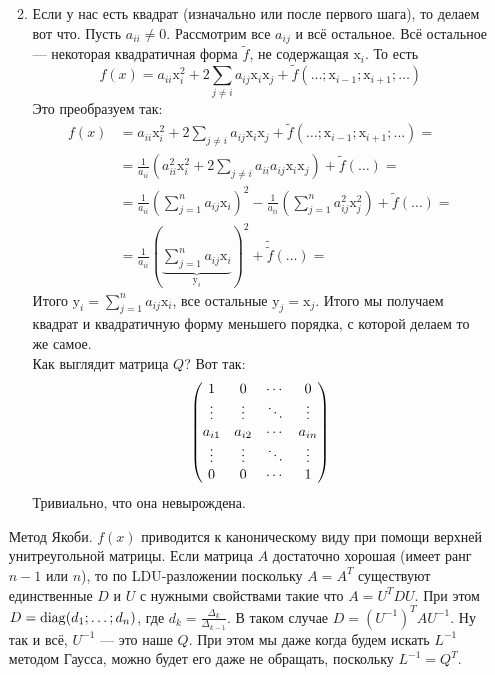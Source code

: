 \documentclass{article}
\begin{document}
\begin{itemize}
\begin{Comment}
\begin{enumerate}
$${                }
                $$
                \item Если у нас есть квадрат (изначально или после первого шага), то делаем вот что. Пусть $a_{ii}\neq0$. Рассмотрим все $a_{ij}$ и всё остальное. Всё остальное --- некоторая квадратичная форма $\widetilde f$, не содержащая $\mathrm x_i$. То есть
                $$
                f(x)=a_{ii}\mathrm x_i^2+2\sum\limits_{j\neq i}a_{ij}\mathrm x_i\mathrm x_j+\widetilde f(\ldots;\mathrm x_{i-1};\mathrm x_{i+1};\ldots)
                $$
                Это преобразуем так:
                \[\begin{split}
                    f(x)&=a_{ii}\mathrm x_i^2+2\sum\limits_{j\neq i}a_{ij}\mathrm x_i\mathrm x_j+\widetilde f(\ldots;\mathrm x_{i-1};\mathrm x_{i+1};\ldots)=\\
                    &=\frac1{a_{ii}}\left(a_{ii}^2\mathrm x_i^2+2\sum\limits_{j\neq i}a_{ii}a_{ij}\mathrm x_i\mathrm x_j\right)+\widetilde f(\ldots)=\\
                    &=\frac1{a_{ii}}\left(\sum\limits_{j=1}^na_{ij}\mathrm x_i\right)^2-\frac1{a_{ii}}\left(\sum\limits_{j=1}^na_{ij}^2\mathrm x_j^2\right)+\widetilde f(\ldots)=\\
                    &=\frac1{a_{ii}}\left(\underbrace{\sum\limits_{j=1}^na_{ij}\mathrm x_i}_{\mathrm y_i}\right)^2+\widetilde{\widetilde f}(\ldots)=
                \end{split}\]
                Итого $\mathrm y_i=\sum\limits_{j=1}^na_{ij}\mathrm x_i$, все остальные $\mathrm y_j=\mathrm x_j$.
                Итого мы получаем квадрат и квадратичную форму меньшего порядка, с которой делаем то же самое.\\
                Как выглядит матрица $Q$? Вот так:
                $$
                \left(\begin{matrix}
                    1 & 0 & \cdots & 0\\
                    \vdots & \vdots & \ddots & \vdots\\
                    a_{i1} & a_{i2} & \cdots & a_{in}\\
                    \vdots & \vdots & \ddots & \vdots\\
                    0 & 0 & \cdots & 1
                \end{matrix}\right)
                $$
                Тривиально, что она невырождена.
            \end{enumerate}
        \end{Comment}
        \begin{Comment}
            Метод Якоби. $f(x)$ приводится к каноническому виду при помощи верхней унитреугольной матрицы. Если матрица $A$ достаточно хорошая (имеет ранг $n-1$ или $n$), то по LDU-разложении поскольку $A=A^T$ существуют единственные $D$ и $U$ с нужными свойствами такие что $A=U^TDU$. При этом $D=\operatorname{diag}(d_1;\ldots;d_n)$, где $d_k=\frac{\Delta_k}{\Delta_{k-1}}$. В таком случае $D=(U^{-1})^TAU^{-1}$. Ну так и всё, $U^{-1}$ --- это наше $Q$. При этом мы даже когда будем искать $L^{-1}$ методом Гаусса, можно будет его даже не обращать, поскольку $L^{-1}=Q^T$.

\end{Comment}
\end{itemize}
\end{document}
